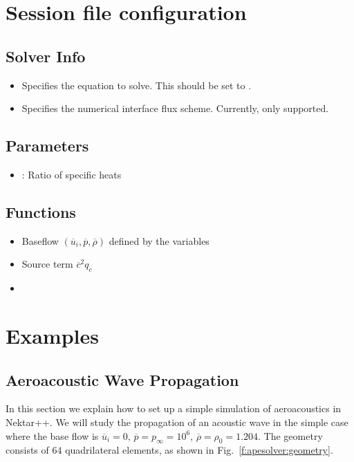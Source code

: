 \section{Session file configuration}

\subsection{Solver Info}
\begin{itemize}
\item {} Specifies the equation to solve. This should be set to
.
\item {} Specifies the numerical interface flux scheme.
Currently, only  supported.
\end{itemize}

\subsection{Parameters}
\begin{itemize}
\item {}: Ratio of specific heats
\end{itemize}

\subsection{Functions}
\begin{itemize}
\item {} Baseflow $(\overline{u}_i, \overline{p}, \overline{\rho})$ defined by the variables 
\item {} Source term $\overline{c}^2 q_c$
\item {}
\end{itemize}


\section{Examples}
\subsection{Aeroacoustic Wave Propagation}
In this section we explain how to set up a simple simulation of aeroacoustics in
Nektar++. We will study the propagation of an acoustic wave in the simple case
where the base flow is $\overline{u}_i = 0, \, \overline{p}=p_{\infty}=10^6, \, \overline{\rho} = \rho_0 = 1.204$. The geometry consists
of $64$ quadrilateral elements, as shown in Fig.~\ref{f:apesolver:geometry}.

